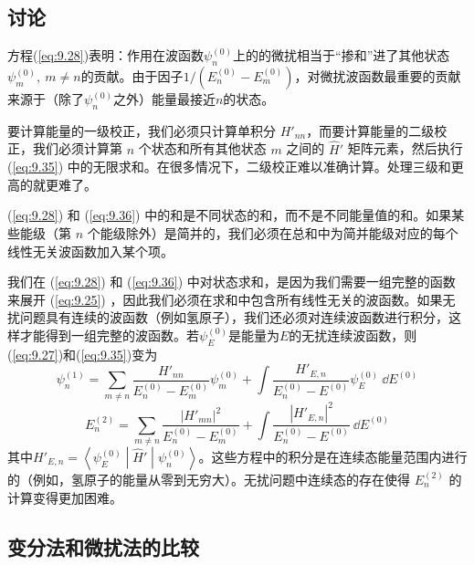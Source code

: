 \subsection*{讨论}

    方程(\ref{eq:9.28})表明：作用在波函数$\psi_n^{\left(0\right)}$上的的微扰相当于“掺和”进了其他状态$\psi_m^{\left(0\right)},\:m \neq n$的贡献。由于因子$1/\left(E_n^{\left(0\right)} - E_m^{\left(0\right)}\right)$，对微扰波函数最重要的贡献来源于（除了$\psi_n^{\left(0\right)}$之外）能量最接近$n$的状态。

    要计算能量的一级校正，我们必须只计算单积分 $H'_{nn}$，而要计算能量的二级校正，我们必须计算第 $n$ 个状态和所有其他状态 $m$ 之间的 $\hat{H}'$ 矩阵元素，然后执行 (\ref{eq:9.35}) 中的无限求和。在很多情况下，二级校正难以准确计算。处理三级和更高的就更难了。

    (\ref{eq:9.28}) 和 (\ref{eq:9.36}) 中的和是不同状态的和，而不是不同能量值的和。如果某些能级（第 $n$ 个能级除外）是简并的，我们必须在总和中为简并能级对应的每个线性无关波函数加入某个项。

    我们在 (\ref{eq:9.28}) 和 (\ref{eq:9.36}) 中对状态求和，是因为我们需要一组完整的函数来展开 (\ref{eq:9.25}) ，因此我们必须在求和中包含所有线性无关的波函数。如果无扰问题具有连续的波函数（例如氢原子），我们还必须对连续波函数进行积分，这样才能得到一组完整的波函数。若$\psi_E^{\left(0\right)}$是能量为$E$的无扰连续波函数，则(\ref{eq:9.27})和(\ref{eq:9.35})变为
    \begin{equation*}
        \psi_n^{\left(1\right)} = \sum_{m \neq n} \frac{H'_{nn}}{E_n^{\left(0\right)} - E_m^{\left(0\right)}} \psi_m^{\left(0\right)} + \int \frac{H'_{E,n}}{E_n^{\left(0\right)} - E^{\left(0\right)}} \psi_E^{\left(0\right)} \:\dd E^{\left(0\right)}
    \end{equation*}
    \begin{equation}
        E_n^{\left(2\right)} = \sum_{m \neq n} \frac{\left|H'_{mn}\right|^2}{E_n^{\left(0\right)} - E_m^{\left(0\right)}} + \int \frac{\left|H'_{E,n}\right|^2}{E_n^{\left(0\right)} - E^{\left(0\right)}} \:\dd E^{\left(0\right)}
        \label{eq:9.37}
    \end{equation}
    其中$H'_{E,n} = \left\langle \psi_E^{\left(0\right)} \middle| \hat{H}' \middle| \psi_n^{\left(0\right)} \right\rangle$。这些方程中的积分是在连续态能量范围内进行的（例如，氢原子的能量从零到无穷大）。无扰问题中连续态的存在使得 $E_n^{\left(2\right)}$ 的计算变得更加困难。

\subsection*{变分法和微扰法的比较}

